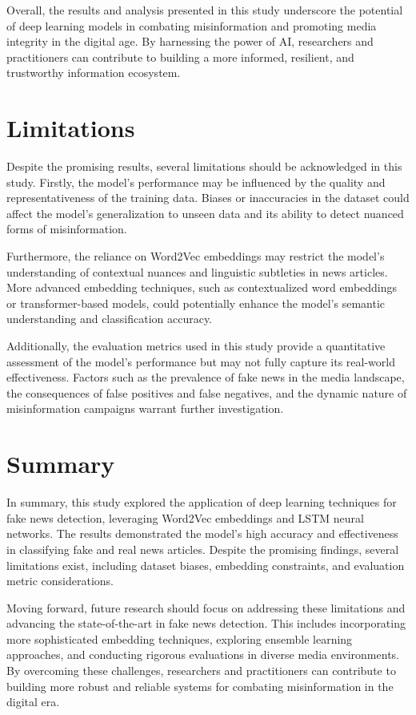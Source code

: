 Overall, the results and analysis presented in this study underscore the potential of deep learning models in combating misinformation and promoting media integrity in the digital age. By harnessing the power of AI, researchers and practitioners can contribute to building a more informed, resilient, and trustworthy information ecosystem.


\section{Limitations}

Despite the promising results, several limitations should be acknowledged in this study. Firstly, the model's performance may be influenced by the quality and representativeness of the training data. Biases or inaccuracies in the dataset could affect the model's generalization to unseen data and its ability to detect nuanced forms of misinformation.

Furthermore, the reliance on Word2Vec embeddings may restrict the model's understanding of contextual nuances and linguistic subtleties in news articles. More advanced embedding techniques, such as contextualized word embeddings or transformer-based models, could potentially enhance the model's semantic understanding and classification accuracy.

Additionally, the evaluation metrics used in this study provide a quantitative assessment of the model's performance but may not fully capture its real-world effectiveness. Factors such as the prevalence of fake news in the media landscape, the consequences of false positives and false negatives, and the dynamic nature of misinformation campaigns warrant further investigation.

\section{Summary}

In summary, this study explored the application of deep learning techniques for fake news detection, leveraging Word2Vec embeddings and LSTM neural networks. The results demonstrated the model's high accuracy and effectiveness in classifying fake and real news articles. Despite the promising findings, several limitations exist, including dataset biases, embedding constraints, and evaluation metric considerations.

Moving forward, future research should focus on addressing these limitations and advancing the state-of-the-art in fake news detection. This includes incorporating more sophisticated embedding techniques, exploring ensemble learning approaches, and conducting rigorous evaluations in diverse media environments. By overcoming these challenges, researchers and practitioners can contribute to building more robust and reliable systems for combating misinformation in the digital era.

 

 

 




